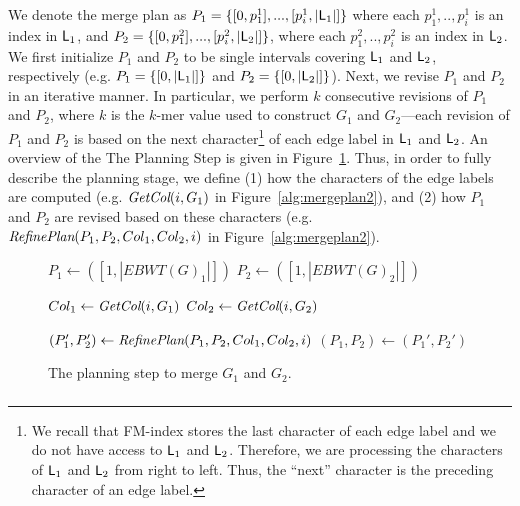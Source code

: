 We denote the merge plan as $P_1 = \{[0, p^1_1],...,[p^1_i, |\mbox{\rm {\sf L}}_{1}|]\}$ where each $p^1_1,..,p^1_i$ is an index in $\mbox{\rm {\sf L}}_{1}$, and $P_2 = \{[0, p^2_1],...,[p^2_i, |\mbox{\rm {\sf L}}_{2}|]\}$, where each $p^2_1,..,p^2_i$ is an index in $\mbox{\rm {\sf L}}_{2}$.   We first initialize $P_1$ and $P_2$ to be single intervals covering $\mbox{\rm {\sf L}}_1$ and $\mbox{\rm {\sf L}}_2$, respectively (e.g. $P_1 = \{[0, |\mbox{\rm {\sf L}}_1|]\}$ and  $P_2 = \{[0, |\mbox{\rm {\sf L}}_2|]\}$). Next, we revise $P_1$ and $P_2$ in an iterative manner.  In particular, we perform $k$ consecutive revisions of $P_1$ and $P_2$, where $k$ is the $k$-mer value used to construct $G_1$ and $G_2$---each revision of $P_1$ and $P_2$ is based on the next character\footnote{We recall that FM-index stores the last character of each edge label and we do not have access to $\mbox{\rm {\sf L}}_1$ and $\mbox{\rm {\sf L}}_2$.  Therefore, we are processing the characters of $\mbox{\rm {\sf L}}_1$ and $\mbox{\rm {\sf L}}_2$ from right to left.  Thus, the ``next'' character is the preceding character of an edge label.} of each edge label in $\mbox{\rm {\sf L}}_1$ and $\mbox{\rm {\sf L}}_2$.  An overview of the The Planning Step is given in Figure~\ref{alg:mergeplan1}.  Thus, in order to fully describe the planning stage, we define (1) how the characters of the edge labels are computed (e.g. $\emph{GetCol}(i, G_1)$ in Figure~\ref{alg:mergeplan2}), and (2) how $P_1$ and $P_2$ are revised based on these characters (e.g. $\emph{RefinePlan}(P_1, P_2, Col_1, Col_2, i)$ in Figure~\ref{alg:mergeplan2}).

\begin{figure}
\begin{algorithmic}

\State {}
\State $P_1 \leftarrow ([1, |EBWT(G)_1|])$
\State $P_2 \leftarrow ([1, |EBWT(G)_2|])$

\State $Col_1 \leftarrow \emph{GetCol}(i, G_1)$
\State $Col_2 \leftarrow \emph{GetCol}(i, G_2)$

\State {}
\State $(P_1', P_2') \leftarrow \emph{RefinePlan}(P_1, P_2, Col_1, Col_2, i)$
\State $(P_1, P_2) \leftarrow (P_1', P_2')$
\EndFor
\end{algorithmic}

\caption{The planning step to merge $G_1$ and $G_2$. } \label{alg:mergeplan1}
\end{figure}

\subsubsection{}

